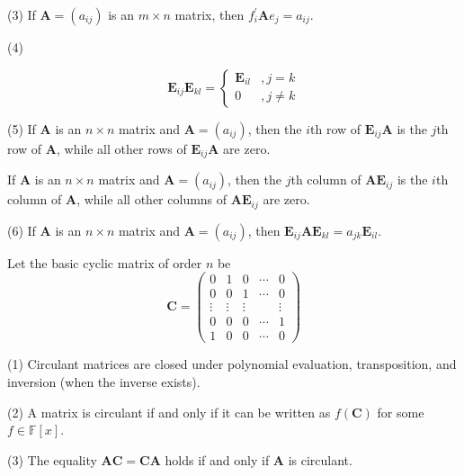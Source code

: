 \documentclass[12pt, a4paper, oneside]{book}
\begin{document}
\begin{theorem}
    (3) If $\mathbf{A}=\left(a_{i j}\right)$ is an $m \times n$ matrix, then ${f}_i^{\prime} \mathbf{A} {e}_j=a_{i j}$.

    (4)



    \[
        \mathbf{E}_{i j} \mathbf{E}_{k l}
        =
        \begin{cases}
            \mathbf{E}_{i l} & ,j=k     \\
            0                & ,j\neq k
        \end{cases}
    \]

    (5) If $\mathbf{A}$ is an $n \times n$ matrix and $\mathbf{A}=\left(a_{i j}\right)$, then the $i$th row of $\mathbf{E}_{i j} \mathbf{A}$ is the $j$th row of $\mathbf{A}$, while all other rows of $\mathbf{E}_{i j} \mathbf{A}$ are zero.

    If $\mathbf{A}$ is an $n \times n$ matrix and $\mathbf{A}=\left(a_{i j}\right)$, then the $j$th column of $\mathbf{A} \mathbf{E}_{i j}$ is the $i$th column of $\mathbf{A}$, while all other columns of $\mathbf{A} \mathbf{E}_{i j}$ are zero.

    (6) If $\mathbf{A}$ is an $n \times n$ matrix and $\mathbf{A}=\left(a_{i j}\right)$, then $\mathbf{E}_{i j} \mathbf{A} \mathbf{E}_{k l}=a_{j k} \mathbf{E}_{i l}$.

\end{theorem}










\begin{theorem}
    Let the basic cyclic matrix of order $n$ be
    \[
        \mathbf{C}
        =
        \left(
        \begin{matrix}
                0      & 1      & 0      & \cdots & 0      \\
                0      & 0      & 1      & \cdots & 0      \\
                \vdots & \vdots & \vdots &        & \vdots \\
                0      & 0      & 0      & \cdots & 1      \\
                1      & 0      & 0      & \cdots & 0
            \end{matrix}
        \right)
    \]

    (1) Circulant matrices are closed under polynomial evaluation, transposition, and inversion (when the inverse exists).

    (2) A matrix is circulant if and only if it can be written as $f(\mathbf{C})$ for some $f \in \mathbb{F}[x]$.

    (3) The equality $\mathbf{A}\mathbf{C}=\mathbf{C}\mathbf{A}$ holds if and only if $\mathbf{A}$ is circulant.
\end{theorem}
\end{document}
